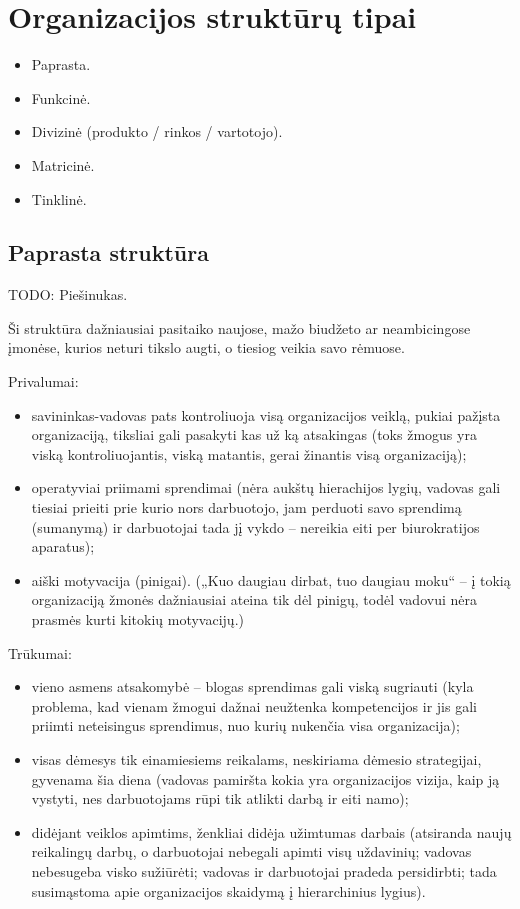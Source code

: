 \section{Organizacijos struktūrų tipai}

\begin{itemize}
  \item Paprasta.
  \item Funkcinė.
  \item Divizinė (produkto / rinkos / vartotojo).
  \item Matricinė.
  \item Tinklinė.
\end{itemize}

\subsection{Paprasta struktūra}

TODO: Piešinukas.

Ši struktūra dažniausiai pasitaiko naujose, mažo biudžeto ar
neambicingose įmonėse, kurios neturi tikslo augti, o tiesiog veikia
savo rėmuose.

Privalumai:
\begin{itemize}
  \item savininkas-vadovas pats kontroliuoja visą organizacijos veiklą,
    pukiai pažįsta organizaciją, tiksliai gali pasakyti kas už ką
    atsakingas (toks žmogus yra viską kontroliuojantis, viską matantis,
    gerai žinantis visą organizaciją);
  \item operatyviai priimami sprendimai (nėra aukštų hierachijos lygių,
    vadovas gali tiesiai prieiti prie kurio nors darbuotojo, jam
    perduoti savo sprendimą (sumanymą) ir darbuotojai tada jį vykdo –
    nereikia eiti per biurokratijos aparatus);
  \item aiški motyvacija (pinigai). („Kuo daugiau dirbat, tuo daugiau
    moku“ – į tokią organizaciją žmonės dažniausiai ateina tik dėl
    pinigų, todėl vadovui nėra prasmės kurti kitokių motyvacijų.)
\end{itemize}

Trūkumai:
\begin{itemize}
  \item vieno asmens atsakomybė – blogas sprendimas gali viską sugriauti
    (kyla problema, kad vienam žmogui dažnai neužtenka kompetencijos
    ir jis gali priimti neteisingus sprendimus, nuo kurių nukenčia
    visa organizacija);
  \item visas dėmesys tik einamiesiems reikalams, neskiriama dėmesio
    strategijai, gyvenama šia diena (vadovas pamiršta kokia yra
    organizacijos vizija, kaip ją vystyti, nes darbuotojams rūpi tik
    atlikti darbą ir eiti namo);
  \item didėjant veiklos apimtims, ženkliai didėja užimtumas darbais
    (atsiranda naujų reikalingų darbų, o darbuotojai nebegali apimti
    visų uždavinių; vadovas nebesugeba visko sužiūrėti; vadovas ir
    darbuotojai pradeda persidirbti; tada susimąstoma apie organizacijos
    skaidymą į hierarchinius lygius).
\end{itemize}

